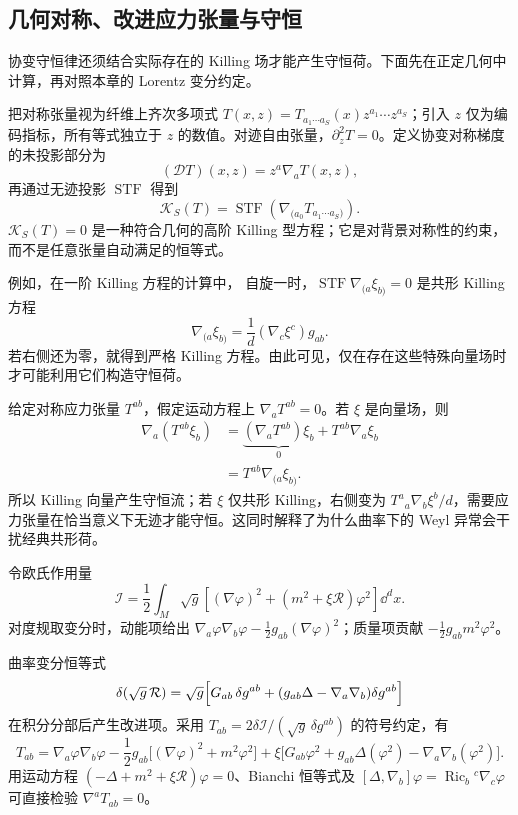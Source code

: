 \subsection{几何对称、改进应力张量与守恒}

协变守恒律还须结合实际存在的 Killing 场才能产生守恒荷。下面先在正定几何中计算，再对照本章的 Lorentz 变分约定。

把对称张量视为纤维上齐次多项式 $T(x,z)=T_{a_1\cdots a_S}(x)z^{a_1}\cdots z^{a_S}$；引入 $z$ 仅为编码指标，所有等式独立于 $z$ 的数值。对迹自由张量，$\partial_z^2T=0$。定义协变对称梯度的未投影部分为
\[
 (\mathcal D T)(x,z)=z^a\nabla_aT(x,z),
\]
再通过无迹投影 $\operatorname{STF}$ 得到
\begin{equation}\label{eq:ghs-conformal-killing-tensor-operator}
 \mathcal K_S(T)=\operatorname{STF}(\nabla_{(a_0}T_{a_1\cdots a_S)}).
\end{equation}
$\mathcal K_S(T)=0$ 是一种符合几何的高阶 Killing 型方程；它是对背景对称性的约束，而不是任意张量自动满足的恒等式。

例如，在一阶 Killing 方程的计算中，
自旋一时，$\operatorname{STF}\nabla_{(a}\xi_{b)}=0$ 是共形 Killing 方程
\[
 \nabla_{(a}\xi_{b)}=\frac{1}{d}(\nabla_c\xi^c)g_{ab}.
\]
若右侧还为零，就得到严格 Killing 方程。由此可见，仅在存在这些特殊向量场时才可能利用它们构造守恒荷。

给定对称应力张量 $T^{ab}$，假定运动方程上 $\nabla_aT^{ab}=0$。若 $\xi$ 是向量场，则
\begin{align}
 \nabla_a(T^{ab}\xi_b)
 &=\underbrace{(\nabla_aT^{ab})\xi_b}_{0}
 +T^{ab}\nabla_a\xi_b\nonumber\\
 &=T^{ab}\nabla_{(a}\xi_{b)}.
 \label{eq:ghs-noether-killing-identity}
\end{align}
所以 Killing 向量产生守恒流；若 $\xi$ 仅共形 Killing，右侧变为 $T^a{}_a\nabla_b\xi^b/d$，需要应力张量在恰当意义下无迹才能守恒。这同时解释了为什么曲率下的 Weyl 异常会干扰经典共形荷。

令欧氏作用量
\[
 \mathscr I=\frac12\int_M\sqrt g\left[(\nabla\varphi)^2+(m^2+\xi\mathcal R)\varphi^2\right]\dd^dx.
\]
对度规取变分时，动能项给出 $\nabla_a\varphi\nabla_b\varphi-\frac12g_{ab}(\nabla\varphi)^2$；质量项贡献 $-\frac12g_{ab}m^2\varphi^2$。

曲率变分恒等式
\[
 \delta(\sqrt g\,\mathcal R)=\sqrt g\Bigl[G_{ab}\,\delta g^{ab}
 +(g_{ab}\Delta-\nabla_a\nabla_b)\delta g^{ab}\Bigr]
\]
在积分分部后产生改进项。采用 $T_{ab}=2\delta\mathscr I/(\sqrt g\,\delta g^{ab})$ 的符号约定，有
\[
 T_{ab}=\nabla_a\varphi\nabla_b\varphi
 -\frac12g_{ab}\bigl[(\nabla\varphi)^2+m^2\varphi^2\bigr]
 +\xi\bigl[G_{ab}\varphi^2+g_{ab}\Delta(\varphi^2)-\nabla_a\nabla_b(\varphi^2)\bigr].
\]
用运动方程 $(-\Delta+m^2+\xi\mathcal R)\varphi=0$、Bianchi 恒等式及 $[\Delta,\nabla_b]\varphi=\operatorname{Ric}_b{}^c\nabla_c\varphi$ 可直接检验 $\nabla^aT_{ab}=0$。


